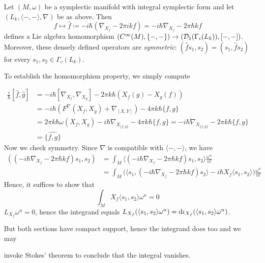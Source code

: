 \documentclass[parskip=half]{scrartcl}
\begin{document}
\begin{onboard}
\begin{prop}
	Let $(M,\omega)$ be a symplectic manifold with integral symplectic form and let $(L_k,\langle-,-\rangle,\nabla)$ be as above. Then
	\begin{equation*}
		f\longmapsto \hat f \coloneqq -i\hbar (\nabla_{X_f}-2\pi i k f)=-i\hbar \nabla_{X_f}-2\pi \hbar kf
	\end{equation*}
	defines a Lie algebra homomorphism $(C^\infty(M),\{-,-\})\to (\mathcal{D}_1(\Gamma_c(L_k)),[-,-])$. Moreover, these densely defined operators are \emph{symmetric}: $(\hat f s_1,s_2)=(s_1,\hat f s_2)$ for every $s_1,s_2\in \Gamma_c(L_k)$.
\end{prop}
\end{onboard}
\begin{myproof}
	To establish the homomorphism property, we simply compute
	\begin{onboard}
	\begin{align*}
		\frac{i}{\hbar}[\hat f,\hat g]&=-i\hbar [\nabla_{X_f},\nabla_{X_g}]-2\pi k\hbar (X_f(g)-X_g(f))\\
		&=-i\hbar (F^\nabla(X_f,X_g)+\nabla_{[X,Y]})-4\pi k\hbar \{f,g\}\\
		&=2\pi k\hbar  \omega(X_f,X_g)-i\hbar \nabla_{X_{\{f,g\}}}-4\pi k\hbar \{f,g\}
		=-i\hbar \nabla_{X_{\{f,g\}}}-2\pi k\hbar \{f,g\}\\
		&=\widehat{\{f,g\}}
	\end{align*}
	Now we check symmetry. Since $\nabla$ is compatible with $\langle-,-\rangle$, we have 
	\begin{align*}
		((-i\hbar \nabla_{X_f}-2\pi \hbar k f)s_1,s_2)
		&=\int_M \langle (-i\hbar \nabla_{X_f}-2\pi \hbar k f)s_1,s_2\rangle \frac{\omega^n}{n!}\\
		&=\int_M \Big( \langle s_1,(-i\hbar \nabla_{X_f}-2\pi \hbar k f)s_2\rangle
		-i\hbar X_f\langle s_1,s_2\rangle\Big) \frac{\omega^n}{n!}
	\end{align*}
	Hence, it suffices to show that 
	\begin{equation*}
		\int_M X_f\langle s_1,s_2\rangle \omega^n=0
	\end{equation*}
	$L_{X_f}\omega^n=0$, hence the integrand equals $L_{X_f}(\langle s_1,s_2\rangle \omega^n)=\mathrm{d}\iota_{X_f}(\langle s_1,s_2\rangle \omega^n)$.
	\end{onboard} 
	But both sections have compact support, hence the integrand does too and we may  
	\begin{onboard}
		invoke Stokes' theorem to conclude that the integral vanishes.
	\end{onboard}
\end{myproof}
\end{document}
